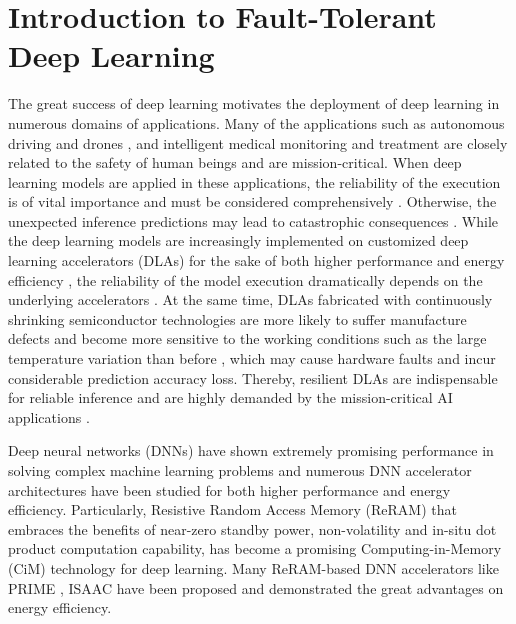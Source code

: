 \section{Introduction to Fault-Tolerant Deep Learning}
The great success of deep learning motivates the deployment of deep learning in numerous domains of applications. Many of the applications such as autonomous driving and drones \cite{fink2019deep, tzelepi2017human}, and intelligent medical monitoring and treatment \cite{esteva2019guide} are closely related to the safety of human beings and are mission-critical. When deep learning models are applied in these applications, the reliability of the execution is of vital importance and must be considered comprehensively \cite{banerjee2019towards, jha2019ml}. Otherwise, the unexpected inference predictions may lead to catastrophic consequences \cite{jenihhin2019challenges}. While the deep learning models are increasingly implemented on customized deep learning accelerators (DLAs) for the sake of both higher performance and energy efficiency \cite{chen2014dadiannao}, the reliability of the model execution dramatically depends on the underlying accelerators \cite{xu2020hybrid, reagen2016minerva}. At the same time, DLAs fabricated with continuously shrinking semiconductor technologies are more likely to suffer manufacture defects and become more sensitive to the working conditions such as the large temperature variation than before \cite{impact2011dixit}, which may cause hardware faults and incur considerable prediction accuracy loss. Thereby, resilient DLAs are indispensable for reliable inference and are highly demanded by the mission-critical AI applications \cite{mittal2020survey}.


Deep neural networks (DNNs) have shown extremely promising performance in solving complex machine learning problems and numerous DNN accelerator architectures have been studied \cite{7551380, 7551379} for both higher performance and energy efficiency. Particularly, Resistive Random Access Memory (ReRAM) that embraces the benefits of near-zero standby power, non-volatility \cite{6193402} and in-situ dot product computation capability, has become a promising Computing-in-Memory (CiM) technology for deep learning. Many ReRAM-based DNN accelerators like PRIME \cite{7551380}, ISAAC \cite{7551379} have been proposed and demonstrated the great advantages on energy efficiency.
    
